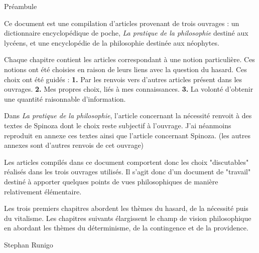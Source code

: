 
\thispagestyle{empty}

\begin{center}
\Large
Préambule
\normalsize
\end{center}
\vspace{3cm}

Ce document est une compilation d'articles provenant de trois ouvrages : un dictionnaire encyclopédique de poche, {\it La pratique de la philosophie} destiné aux lycéens, et une encyclopédie de la philosophie destinée aux néophytes. 

\vspace{1.3cm}

Chaque chapitre contient les articles correspondant à une notion particulière. Ces notions ont été choisies en raison de leurs liens avec la question du hasard. Ces choix ont été guidés : {\bf 1.} Par les renvois vers d'autres articles présent dans les ouvrages. {\bf 2.} Mes propres choix, liés à mes connaissances. {\bf 3.} La volonté d'obtenir une quantité raisonnable d'information.

\vspace{1.3cm}

Dans {\it La pratique de la philosophie}, l'article concernant la nécessité renvoit à des textes de Spinoza dont le choix reste subjectif à l'ouvrage. J'ai néanmoins reproduit en annexe ces textes ainsi que l'article concernant Spinoza. (les autres annexes sont d'autres renvois de cet ouvrage)

Les articles compilés dans ce document comportent donc les choix "discutables" réalisés dans les trois ouvrages utilisés. Il s'agit donc d'un document de "travail" destiné à apporter quelques points de vues philosophiques de manière relativement élémentaire.

\vspace{1.3cm}

Les trois premiers chapitres abordent les thèmes du hasard, de la nécessité puis du vitalisme. Les chapitres suivants élargissent le champ de vision philosophique en abordant les thèmes du déterminisme, de la contingence et de la providence.

\vspace{2.3cm}

\hfill Stephan Runigo

